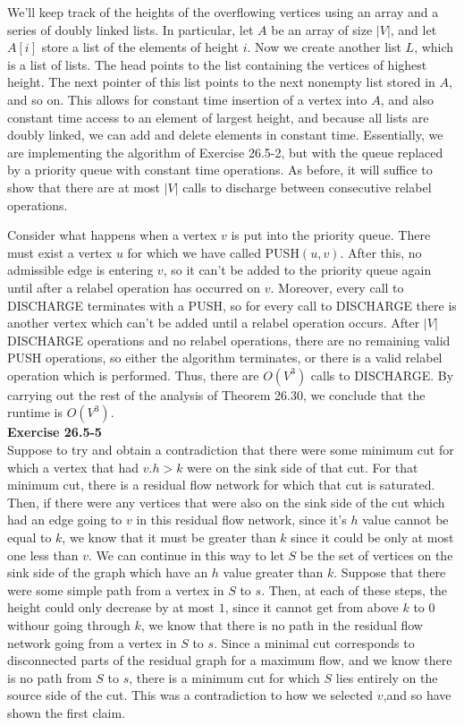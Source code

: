 \documentclass{article}
\begin{document}
We'll keep track of the heights of the overflowing vertices using an array and a series of doubly linked lists.  In particular, let $A$ be an array of size $|V|$, and let $A[i]$ store a list of the elements of height $i$.  Now we create another list $L$, which is a list of lists.  The head points to the list containing the vertices of highest height.  The next pointer of this list points to the next nonempty list stored in $A$, and so on.  This allows for constant time insertion of a vertex into $A$, and also constant time access to an element of largest height, and because all lists are doubly linked, we can add and delete elements in constant time.  Essentially, we are implementing the algorithm of Exercise 26.5-2, but with the queue replaced by a priority queue with constant time operations. As before, it will suffice to show that there are at most $|V|$ calls to discharge between consecutive relabel operations. 

Consider what happens when a vertex $v$ is put into the priority queue.  There must exist a vertex $u$ for which we have called PUSH$(u,v)$.  After this, no admissible edge is entering $v$, so it can't be added to the priority queue again until after a relabel operation has occurred on $v$. Moreover, every call to DISCHARGE terminates with a PUSH, so for every call to DISCHARGE there is another vertex which can't be added until a relabel operation occurs.  After $|V|$ DISCHARGE operations and no relabel operations, there are no remaining valid PUSH operations, so either the algorithm terminates, or there is a valid relabel operation which is performed.  Thus, there are $O(V^3)$ calls to DISCHARGE.  By carrying out the rest of the analysis of Theorem 26.30, we conclude that the runtime is $O(V^3)$.\\


\noindent\textbf{Exercise 26.5-5}\\

Suppose to try and obtain a contradiction that there were some minimum cut for which a vertex that had $v.h > k$ were on the sink side of that cut. For that minimum cut, there is a residual flow network for which that cut is saturated. Then, if there were any vertices that were also on the sink side of the cut which had an edge going to $v$ in this residual flow network, since it's $h$ value cannot be equal to $k$, we know that it must be greater than $k$ since it could be only at most one less than $v$. We can continue in this way to let $S$ be the set of vertices on the sink side of the graph which have an $h$ value greater than $k$. Suppose that there were some simple path from a vertex in $S$ to $s$. Then, at each of these steps, the height could only decrease by at most $1$, since it cannot get from above $k$ to 0 withour going through $k$, we know that there is no path in the residual flow network going from a vertex in $S$ to $s$. Since a minimal cut corresponds to disconnected parts of the residual graph for a maximum flow, and we know there is no path from $S$ to $s$, there is a minimum cut for which $S$ lies entirely on the source side of the cut. This was a contradiction to how we selected $v$,and so have shown the first claim.
\end{document}
